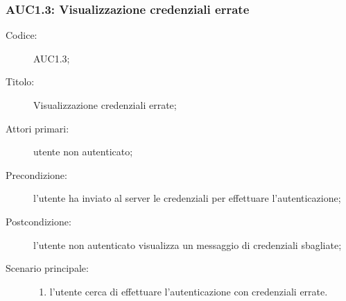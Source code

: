 \documentclass[../../../analisi-dei-requisiti.tex]{subfiles}
\begin{document}
\subsubsection{AUC1.3: Visualizzazione credenziali errate}%
\label{subs:AUC1.3}
\begin{description}
  \item[Codice:] AUC1.3;
  \item[Titolo:] Visualizzazione credenziali errate;
  \item[Attori primari:] utente non autenticato;
  \item[Precondizione:] l'utente ha inviato al server le credenziali per effettuare l'autenticazione;
  \item[Postcondizione:] l'utente non autenticato visualizza un messaggio di credenziali sbagliate;
  \item[Scenario principale:]
  \begin{enumerate}
    \item l'utente cerca di effettuare l'autenticazione con credenziali errate.
  \end{enumerate}
\end{description}
\end{document}
